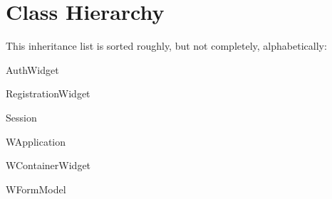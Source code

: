 \section{Class Hierarchy}
This inheritance list is sorted roughly, but not completely, alphabetically\+:\begin{DoxyCompactList}
\item Auth\+Widget\begin{DoxyCompactList}
\item {}
\end{DoxyCompactList}
\item {}
\item Registration\+Widget\begin{DoxyCompactList}
\item {}
\end{DoxyCompactList}
\item Session\begin{DoxyCompactList}
\item {}
\end{DoxyCompactList}
\item {}
\item W\+Application\begin{DoxyCompactList}
\item {}
\end{DoxyCompactList}
\item W\+Container\+Widget\begin{DoxyCompactList}
\item {}
\end{DoxyCompactList}
\item W\+Form\+Model\begin{DoxyCompactList}
\item {}
\end{DoxyCompactList}
\end{DoxyCompactList}
